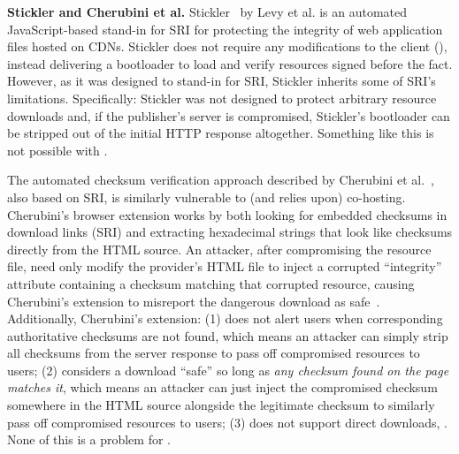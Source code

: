 \noindent\textbf{Stickler and Cherubini et al.} Stickler~\cite{Stickler} by Levy
et al. is an automated JavaScript-based stand-in for SRI for protecting the
integrity of web application files hosted on CDNs. Stickler does not require any
modifications to the client (), instead delivering a bootloader
to load and verify resources signed before the fact. However, as it was designed
to stand-in for SRI, Stickler inherits some of SRI's limitations. Specifically:
Stickler was not designed to protect arbitrary resource downloads and, if the
publisher's server is compromised, Stickler's bootloader can be stripped out of
the initial HTTP response altogether. Something like this is not possible with
\SYSTEM{}.

The automated checksum verification approach described by Cherubini et
al.~\cite{Cherubini}, also based on SRI, is similarly vulnerable to (and relies
upon) co-hosting. Cherubini's browser extension works by both looking for
embedded checksums in download links (SRI) and extracting hexadecimal strings
that look like checksums directly from the HTML source. An attacker, after
compromising the resource file, need only modify the provider's HTML file to
inject a corrupted ``integrity'' attribute containing a checksum matching that
corrupted resource, causing Cherubini's extension to misreport the dangerous
download as safe~\cite{Cherubini}. Additionally, Cherubini's extension: (1) does
not alert users when corresponding authoritative checksums are not found, which
means an attacker can simply strip all checksums from the server response to
pass off compromised resources to users; (2) considers a download ``safe'' so
long as \emph{any checksum found on the page matches it}, which means an
attacker can just inject the compromised checksum somewhere in the HTML source
alongside the legitimate checksum to similarly pass off compromised resources to
users; (3) does not support direct downloads, . None of
this is a problem for \SYSTEM{}.
